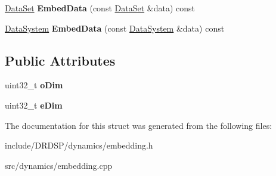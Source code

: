 \begin{DoxyCompactItemize}
\item 
\hypertarget{struct_d_r_d_s_p_1_1_embedding_c_w_ad63dfe0eeab18767684e46cd3000ef83}{\hyperlink{struct_d_r_d_s_p_1_1_data_set}{Data\-Set} {\bfseries Embed\-Data} (const \hyperlink{struct_d_r_d_s_p_1_1_data_set}{Data\-Set} \&data) const }\label{struct_d_r_d_s_p_1_1_embedding_c_w_ad63dfe0eeab18767684e46cd3000ef83}

\item 
\hypertarget{struct_d_r_d_s_p_1_1_embedding_c_w_a3ac7659dca082002fef531dd9403ee1f}{\hyperlink{struct_d_r_d_s_p_1_1_data_system}{Data\-System} {\bfseries Embed\-Data} (const \hyperlink{struct_d_r_d_s_p_1_1_data_system}{Data\-System} \&data) const }\label{struct_d_r_d_s_p_1_1_embedding_c_w_a3ac7659dca082002fef531dd9403ee1f}

\end{DoxyCompactItemize}
\subsection*{Public Attributes}
\begin{DoxyCompactItemize}
\item 
\hypertarget{struct_d_r_d_s_p_1_1_embedding_c_w_aa3f8538fb8f9341f744f79a2bda8d8ef}{uint32\-\_\-t {\bfseries o\-Dim}}\label{struct_d_r_d_s_p_1_1_embedding_c_w_aa3f8538fb8f9341f744f79a2bda8d8ef}

\item 
\hypertarget{struct_d_r_d_s_p_1_1_embedding_c_w_ade05f2b8835edeb8b418bcd27d2d74db}{uint32\-\_\-t {\bfseries e\-Dim}}\label{struct_d_r_d_s_p_1_1_embedding_c_w_ade05f2b8835edeb8b418bcd27d2d74db}

\end{DoxyCompactItemize}


The documentation for this struct was generated from the following files\-:\begin{DoxyCompactItemize}
\item 
include/\-D\-R\-D\-S\-P/dynamics/embedding.\-h\item 
src/dynamics/embedding.\-cpp\end{DoxyCompactItemize}
